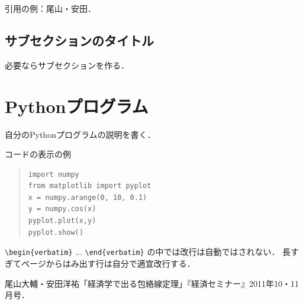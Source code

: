 \documentclass[11pt,a4j,fleqn]{jarticle}
\begin{document}
引用の例：尾山・安田\cite{OyamaYasuda11}．


\subsection{サブセクションのタイトル}

必要ならサブセクションを作る．



\section{Pythonプログラム}

自分のPythonプログラムの説明を書く．

コードの表示の例
\begin{quote}
\begin{verbatim}
import numpy
from matplotlib import pyplot
x = numpy.arange(0, 10, 0.1)
y = numpy.cos(x)
pyplot.plot(x,y)
pyplot.show()
\end{verbatim}
\end{quote}

\verb|\begin{verbatim}| ... \verb|\end{verbatim}| の中では改行は自動ではされない．
長すぎてページからはみ出す行は自分で適宜改行する．



\begin{thebibliography}{0}
尾山大輔・安田洋祐「経済学で出る包絡線定理」『経済セミナー』2011年10・11月号．
\end{thebibliography}
\end{document}
